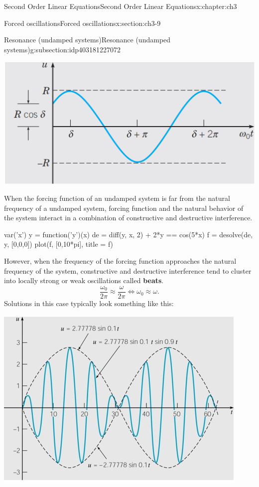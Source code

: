 \documentclass[oneside,10pt,]{book}
\newcommand{\terminology}[1]{\textbf{#1}}
\numberwithin{equation}{section}
\numberwithin{equation}{section}
\begin{document}
\begin{chapterptx}{Second Order Linear Equations}{}{Second Order Linear Equations}{}{}{x:chapter:ch3}
\begin{sectionptx}{Forced oscillations}{}{Forced oscillations}{}{}{x:section:ch3-9}
%
%
\typeout{************************************************}
\typeout{************************************************}
%
\begin{subsectionptx}{Resonance (undamped systems)}{}{Resonance (undamped systems)}{}{}{g:subsection:idp403181227072}
\begin{image}{0}{1}{0}%
\includegraphics[width=\linewidth]{images/3.7-1.png}
\end{image}%
When the forcing function of an undamped system  is far from the natural frequency of a undamped system, forcing function and the natural behavior of the system interact in a combination of constructive and destructive interference. \leavevmode%
\begin{sageinput}
var('x')
y = function('y')(x)
de = diff(y, x, 2) + 2*y == cos(5*x)
f = desolve(de, y, [0,0,0])
plot(f, [0,10*pi], title = f)
\end{sageinput}
 However, when the frequency of the forcing function approaches the natural frequency of the system, constructive and destructive interference tend to cluster into locally strong or weak oscillations called \terminology{beats}.%
\begin{equation*}
\frac{\omega_{0}}{2\pi}\approx\frac{\omega}{2\pi}\iff\omega_{0}\approx\omega.
\end{equation*}
Solutions in this case typically look something like this: \begin{image}{0}{1}{0}%
\includegraphics[width=\linewidth]{images/3.8-2.jpg}

\end{image}
\end{subsectionptx}
\end{sectionptx}
\end{chapterptx}
\end{document}
